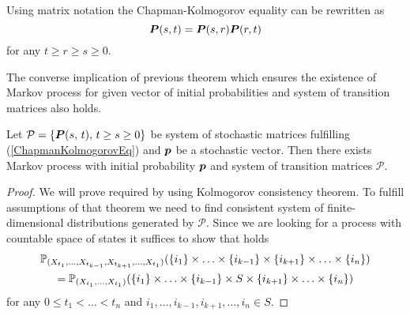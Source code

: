 {Using matrix notation the Chapman-Kolmogorov equality can be rewritten as
\[
	\bm{P} (s, t) = \bm{P} (s, r) \bm{P} (r, t)
\]
for any $t \geq r \geq s \geq 0$.

The converse implication of previous theorem which ensures the existence of Markov process for given vector of initial probabilities and system of transition matrices also holds.

\begin{proposition}
	Let $\mathcal{P} = \{ \bm{P} (s ,\, t) ,\, t \geq s \geq 0 \}$ be system of stochastic matrices fulfilling (\ref{ChapmanKolmogorovEq}) and $\bm{p}$ be a stochastic vector. Then there exists Markov process with initial probability $\bm{p}$ and system of transition matrices $\mathcal{P}$.
\end{proposition}

\begin{proof}
	We will prove required by using Kolmogorov consistency theorem. To fulfill assumptions of that theorem we need to find consistent system of finite-dimensional distributions generated by $\mathcal{P}$. Since we are looking for a process with countable space of states it suffices to show that holds
	\begin{multline*}
		\operatorname{\mathbb{P}}_{(X_{t_1}, \ldots , X_{t_{k-1}}, X_{t_{k+1}}, \ldots , X_{t_1})} (\{i_1\} \times \ldots  \times \{i_{k-1}\} \times \{i_{k+1}\} \times \ldots  \times \{i_n\}) \\
		= \operatorname{\mathbb{P}}_{(X_{t_1}, \ldots , X_{t_1})} (\{i_1\} \times \ldots  \times \{i_{k-1}\} \times S \times \{i_{k+1}\} \times \ldots  \times \{i_n\})
	\end{multline*}
	for any $0 \leq t_1 < \ldots < t_n$ and $i_1, \ldots, i_{k-1}, i_{k+1}, \ldots, i_n \in S$. 
	

\end{proof}}
